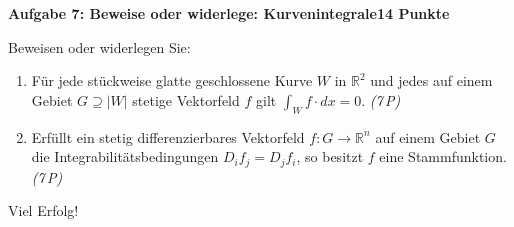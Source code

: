 \documentclass[a4paper,12pt]{article}
\newcommand{\pkt}[1]{\hfill\textit{(#1\,P)}}
\newcommand{\aufgabe}[3]{%
  \bigskip\par\noindent\textbf{Aufgabe #1: #2}\hfill\textbf{#3 Punkte}%
  \par\nobreak\medskip}
\begin{document}
\aufgabe{7}{Beweise oder widerlege: Kurvenintegrale}{14}

Beweisen oder widerlegen Sie:
\begin{enumerate}[label=\alph*)]
  \item Für jede stückweise glatte geschlossene Kurve $W$ in $\mathbb{R}^2$ und jedes auf einem Gebiet $G\supseteq|W|$ stetige Vektorfeld $f$ gilt $\displaystyle\int_W f\cdot dx=0$. \pkt{7}
  \item Erfüllt ein stetig differenzierbares Vektorfeld $f:G\to\mathbb{R}^n$ auf einem Gebiet $G$ die Integrabilitätsbedingungen $D_i f_j=D_j f_i$, so besitzt $f$ eine Stammfunktion. \pkt{7}
\end{enumerate}

\vfill
\begin{center}\small Viel Erfolg!\end{center}
\end{document}
